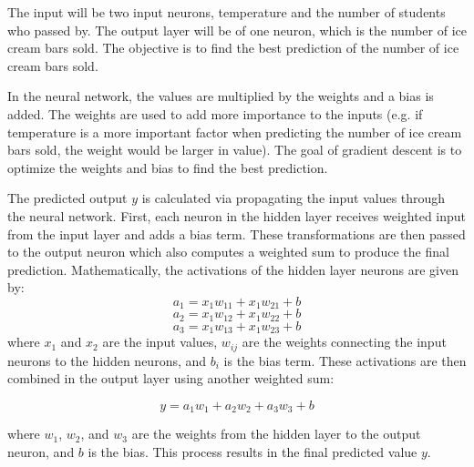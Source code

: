 \documentclass[12pt]{article}
\theoremstyle{definition}
\begin{document}
\begin{table}[h]
    \centering
    \caption{Ice Cream Sales vs Temperature}
    \label{tab:ice_cream_sales}
\end{table}
The input will be two input neurons, temperature and the number of students who passed by. The output layer will be of one neuron, which is the number of ice cream bars sold. The objective is to find the best prediction of the number of ice cream bars sold.

In the neural network, the values are multiplied by the weights and a bias is added. The weights are used to add more importance to the inputs (e.g. if temperature is a more important factor when predicting the number of ice cream bars sold, the weight would be larger in value). The goal of gradient descent is to optimize the weights and bias to find the best prediction. 

The predicted output $y$ is calculated via propagating the input values through the neural network. First, each neuron in the hidden layer receives weighted input from the input layer and adds a bias term. These transformations are then passed to the output neuron which also computes a weighted sum to produce the final prediction. Mathematically, the activations of the hidden layer neurons are given by:
\[
a_{1} = x_{1}w_{11}+x_{1}w_{21}+b
\]
\[
a_{2} = x_{1}w_{12}+x_{1}w_{22}+b
\]
\[
a_{3} = x_{1}w_{13}+x_{1}w_{23}+b
\]
where $x_{1}$ and $x_{2}$ are the input values, $w_{ij}$ are the weights connecting the input neurons to the hidden neurons, and $b_i$ is the bias term. These activations are then combined in the output layer using another weighted sum:

\[y = a_{1}w_{1}+a_{2}w_{2}+a_{3}w_{3}+b\]

where $w_1$, $w_2$, and $w_3$ are the weights from the hidden layer to the output neuron, and $b$ is the bias. This process results in the final predicted value $y$.
\end{document}
